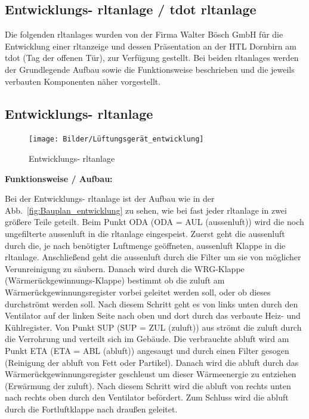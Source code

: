 \subsection{Entwicklungs- \ac{rltanlage} / \gls{tdot} \ac{rltanlage}}

Die folgenden \acp{rltanlage} wurden von der Firma Walter Bösch GmbH für die Entwicklung einer \ac{rltanzeige} und dessen Präsentation an der HTL Dornbirn am \gls{tdot} (Tag der offenen Tür), zur Verfügung gestellt. Bei beiden \acp{rltanlage} werden der Grundlegende Aufbau sowie die Funktionsweise beschrieben und die jeweils verbauten Komponenten näher vorgestellt.

\subsection{Entwicklungs- \ac{rltanlage}} \label{entwicklungs_rlt}

\begin{figure}[H]
	\centering
	\texttt{[image: Bilder/Lüftungsgerät\_entwicklung]}
	\caption{Entwicklungs- \ac{rltanlage}} 
	\label{fig:LG_entwicklung}
\end{figure}

\textbf{Funktionsweise / Aufbau:}

Bei der Entwicklungs- \ac{rltanlage} ist der Aufbau wie in der Abb.~\ref{fig:Bauplan_entwicklung} zu sehen, wie bei fast jeder \ac{rltanlage} in zwei größere Teile geteilt.
Beim Punkt ODA (ODA = AUL (\gls{aussenluft})) wird die noch ungefilterte \gls{aussenluft} in die \ac{rltanlage} eingespeist. Zuerst geht die \gls{aussenluft} durch die, je nach benötigter Luftmenge geöffneten, \gls{aussenluft} Klappe in die \ac{rltanlage}. Anschließend geht die \gls{aussenluft} durch die Filter um sie von möglicher Verunreinigung zu säubern. Danach wird durch die WRG-Klappe (Wärmerückgewinnungs-Klappe) bestimmt ob die \gls{zuluft} am Wärmerückgewinnungsregister vorbei geleitet werden soll, oder ob dieses durchströmt werden soll. Nach diesem Schritt geht es von links unten durch den Ventilator auf der linken Seite nach oben und dort durch das verbaute Heiz- und Kühlregister. Von Punkt SUP (SUP = ZUL (\gls{zuluft})) aus strömt die \gls{zuluft} durch die Verrohrung und verteilt sich im Gebäude. Die verbrauchte \gls{abluft} wird am Punkt ETA (ETA = ABL (\gls{abluft})) angesaugt und durch einen Filter gesogen (Reinigung der \gls{abluft} von \zB Fett oder Partikel). Danach wird die \gls{abluft} durch das Wärmerückgewinnungsregister geschleust um dieser Wärmeenergie zu entziehen (Erwärmung der \gls{zuluft}). Nach diesem Schritt wird die \gls{abluft} von rechts unten nach rechts oben durch den Ventilator befördert. Zum Schluss wird die \gls{abluft} durch die Fortluftklappe nach draußen geleitet. 

